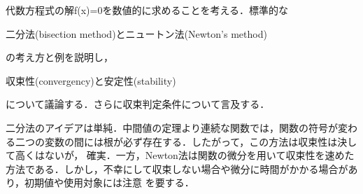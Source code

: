 代数方程式の解f(x)=0を数値的に求めることを考える．標準的な
\begin{center}
二分法(bisection method)とニュートン法(Newton's method)
\end{center}
の考え方と例を説明し，
\begin{center}
収束性(convergency)と安定性(stability)
\end{center}
について議論する．さらに収束判定条件について言及する．


二分法のアイデアは単純．中間値の定理より連続な関数では，関数の符号が変わる二つの変数の間には根が必ず存在する．したがって，この方法は収束性は決して高くはないが，
確実．一方，Newton法は関数の微分を用いて収束性を速めた方法である．しかし，不幸にして収束しない場合や微分に時間がかかる場合があり，初期値や使用対象には注意
を要する．
